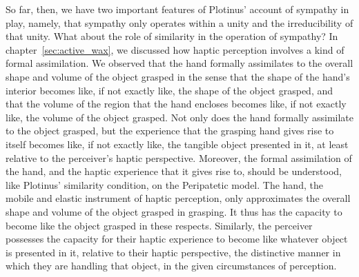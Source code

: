 So far, then, we have two important features of Plotinus' account of sympathy in play, namely, that sympathy only operates within a unity and the irreducibility of that unity. What about the role of similarity in the operation of sympathy? In chapter~\ref{sec:active_wax}, we discussed how haptic perception involves a kind of formal assimilation. We observed that the hand formally assimilates to the overall shape and volume of the object grasped in the sense that the shape of the hand's interior becomes like, if not exactly like, the shape of the object grasped, and that the volume of the region that the hand encloses becomes like, if not exactly like, the volume of the object grasped. Not only does the hand formally assimilate to the object grasped, but the experience that the grasping hand gives rise to itself becomes like, if not exactly like, the tangible object presented in it, at least relative to the perceiver's haptic perspective. Moreover, the formal assimilation of the hand, and the haptic experience that it gives rise to, should be understood, like Plotinus' similarity condition, on the Peripatetic model. The hand, the mobile and elastic instrument of haptic perception, only approximates the overall shape and volume of the object grasped in grasping. It thus has the capacity to become like the object grasped in these respects. Similarly, the perceiver possesses the capacity for their haptic experience to become like whatever object is presented in it, relative to their haptic perspective, the distinctive manner in which they are handling that object, in the given circumstances of perception. 

